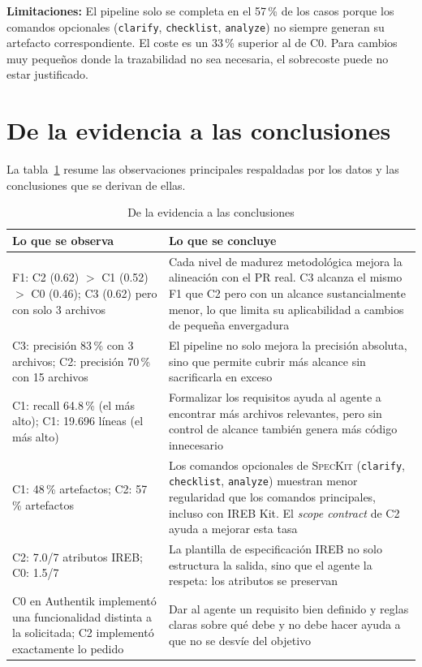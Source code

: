 \textbf{Limitaciones:} El pipeline solo se completa en el 57\,\% de los casos porque los comandos opcionales (\texttt{clarify}, \texttt{checklist}, \texttt{analyze}) no siempre generan su artefacto correspondiente. El coste es un 33\,\% superior al de C0. Para cambios muy peque\~nos donde la trazabilidad no sea necesaria, el sobrecoste puede no estar justificado.

\section{De la evidencia a las conclusiones}

La tabla~\ref{tab:evidencia-conclusiones} resume las observaciones principales respaldadas por los datos y las conclusiones que se derivan de ellas.

\begin{table}[htbp]
\centering
\caption{De la evidencia a las conclusiones}
\label{tab:evidencia-conclusiones}
\begin{tabular}{p{5.5cm}p{8cm}}
\toprule
\textbf{Lo que se observa} & \textbf{Lo que se concluye} \\
\midrule
F1: C2 (0.62) $>$ C1 (0.52) $>$ C0 (0.46); C3 (0.62) pero con solo 3 archivos & Cada nivel de madurez metodol\'ogica mejora la alineaci\'on con el PR real. C3 alcanza el mismo F1 que C2 pero con un alcance sustancialmente menor, lo que limita su aplicabilidad a cambios de peque\~na envergadura \\
C3: precisi\'on 83\,\% con 3 archivos; C2: precisi\'on 70\,\% con 15 archivos & El pipeline no solo mejora la precisi\'on absoluta, sino que permite cubrir m\'as alcance sin sacrificarla en exceso \\
C1: recall 64.8\,\% (el m\'as alto); C1: 19.696 l\'ineas (el m\'as alto) & Formalizar los requisitos ayuda al agente a encontrar m\'as archivos relevantes, pero sin control de alcance tambi\'en genera m\'as c\'odigo innecesario \\
C1: 48\,\% artefactos; C2: 57\,\% artefactos & Los comandos opcionales de \textsc{SpecKit} (\texttt{clarify}, \texttt{checklist}, \texttt{analyze}) muestran menor regularidad que los comandos principales, incluso con IREB Kit. El \emph{scope contract} de C2 ayuda a mejorar esta tasa \\
C2: 7.0/7 atributos IREB; C0: 1.5/7 & La plantilla de especificaci\'on IREB no solo estructura la salida, sino que el agente la respeta: los atributos se preservan \\
C0 en Authentik implement\'o una funcionalidad distinta a la solicitada; C2 implement\'o exactamente lo pedido & Dar al agente un requisito bien definido y reglas claras sobre qu\'e debe y no debe hacer ayuda a que no se desv\'ie del objetivo \\
\bottomrule
\end{tabular}
\end{table}

